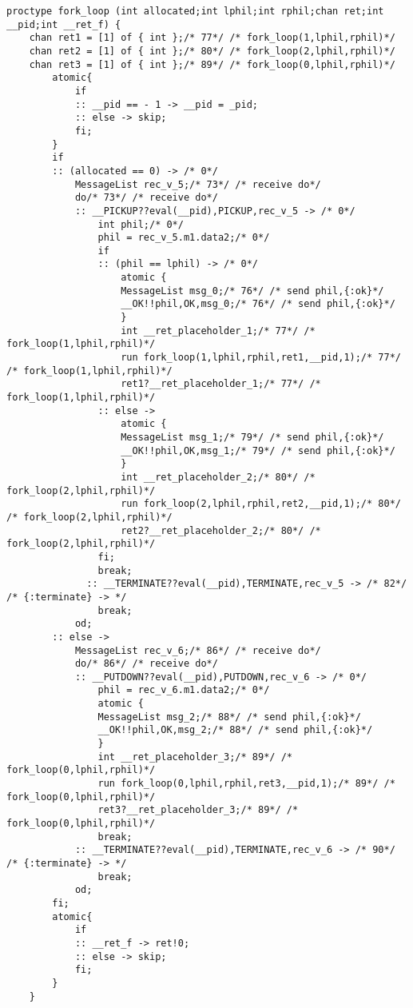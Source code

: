 \begin{lstlisting}[xleftmargin=.001\linewidth, xrightmargin=0.001\linewidth, caption={Dining Philosophers Promela translation.}, label={lst:promela_dp}]
    proctype fork_loop (int allocated;int lphil;int rphil;chan ret;int __pid;int __ret_f) {
    chan ret1 = [1] of { int };/* 77*/ /* fork_loop(1,lphil,rphil)*/ 
    chan ret2 = [1] of { int };/* 80*/ /* fork_loop(2,lphil,rphil)*/ 
    chan ret3 = [1] of { int };/* 89*/ /* fork_loop(0,lphil,rphil)*/ 
        atomic{
            if
            :: __pid == - 1 -> __pid = _pid;
            :: else -> skip;
            fi;
        }
        if
        :: (allocated == 0) -> /* 0*/ 
            MessageList rec_v_5;/* 73*/ /* receive do*/ 
            do/* 73*/ /* receive do*/ 
            :: __PICKUP??eval(__pid),PICKUP,rec_v_5 -> /* 0*/ 
                int phil;/* 0*/ 
                phil = rec_v_5.m1.data2;/* 0*/ 
                if
                :: (phil == lphil) -> /* 0*/ 
                    atomic {
                    MessageList msg_0;/* 76*/ /* send phil,{:ok}*/ 
                    __OK!!phil,OK,msg_0;/* 76*/ /* send phil,{:ok}*/ 
                    }
                    int __ret_placeholder_1;/* 77*/ /* fork_loop(1,lphil,rphil)*/ 
                    run fork_loop(1,lphil,rphil,ret1,__pid,1);/* 77*/ /* fork_loop(1,lphil,rphil)*/ 
                    ret1?__ret_placeholder_1;/* 77*/ /* fork_loop(1,lphil,rphil)*/ 
                :: else -> 
                    atomic {
                    MessageList msg_1;/* 79*/ /* send phil,{:ok}*/ 
                    __OK!!phil,OK,msg_1;/* 79*/ /* send phil,{:ok}*/ 
                    }
                    int __ret_placeholder_2;/* 80*/ /* fork_loop(2,lphil,rphil)*/ 
                    run fork_loop(2,lphil,rphil,ret2,__pid,1);/* 80*/ /* fork_loop(2,lphil,rphil)*/ 
                    ret2?__ret_placeholder_2;/* 80*/ /* fork_loop(2,lphil,rphil)*/ 
                fi;
                break;
              :: __TERMINATE??eval(__pid),TERMINATE,rec_v_5 -> /* 82*/ /* {:terminate} -> */ 
                break;
            od;
        :: else -> 
            MessageList rec_v_6;/* 86*/ /* receive do*/ 
            do/* 86*/ /* receive do*/ 
            :: __PUTDOWN??eval(__pid),PUTDOWN,rec_v_6 -> /* 0*/ 
                phil = rec_v_6.m1.data2;/* 0*/ 
                atomic {
                MessageList msg_2;/* 88*/ /* send phil,{:ok}*/ 
                __OK!!phil,OK,msg_2;/* 88*/ /* send phil,{:ok}*/ 
                }
                int __ret_placeholder_3;/* 89*/ /* fork_loop(0,lphil,rphil)*/ 
                run fork_loop(0,lphil,rphil,ret3,__pid,1);/* 89*/ /* fork_loop(0,lphil,rphil)*/ 
                ret3?__ret_placeholder_3;/* 89*/ /* fork_loop(0,lphil,rphil)*/ 
                break;
            :: __TERMINATE??eval(__pid),TERMINATE,rec_v_6 -> /* 90*/ /* {:terminate} -> */ 
                break;
            od;
        fi;
        atomic{
            if
            :: __ret_f -> ret!0;
            :: else -> skip;
            fi;
        }
    }
    

\end{lstlisting}
